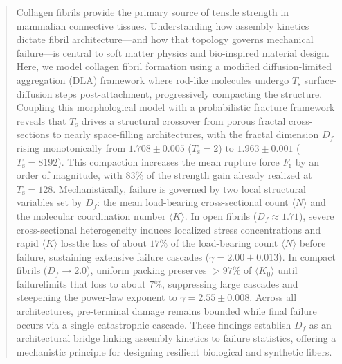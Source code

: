 \documentclass[aps,physrev,preprint,groupedaddress,linenumbers]{revtex4-2}
\newcommand{\added}[1]{{\color{red}#1}}
\newcommand{\deleted}[1]{{\color{red}\sout{#1}}}
\begin{document}
\begin{abstract}
Collagen fibrils provide the primary source of tensile strength in mammalian connective tissues. Understanding how assembly kinetics dictate fibril architecture—and how that topology governs mechanical failure—is central to soft matter physics and bio-inspired material design. Here, we model collagen fibril formation using a modified diffusion-limited aggregation (DLA) framework where rod-like molecules undergo $T_{\mathrm{s}}$ surface-diffusion steps post-attachment, progressively compacting the structure. Coupling this morphological model with a probabilistic fracture framework reveals that $T_{\mathrm{s}}$ drives a structural crossover from porous fractal cross-sections to nearly space-filling architectures, with the fractal dimension $D_f$ rising monotonically from $1.708 \pm 0.005$ ($T_{\mathrm{s}} = 2$) to $1.963 \pm 0.001$ ($T_{\mathrm{s}} = 8192$). This compaction increases the mean rupture force $F_{\mathrm{r}}$ by an order of magnitude, with $83\%$ of the strength gain already realized at $T_{\mathrm{s}} = 128$. Mechanistically, failure is governed by two local structural variables set by $D_f$: the mean load-bearing cross-sectional count $\langle N \rangle$ and the molecular coordination number $\langle K \rangle$. In open fibrils ($D_f \approx 1.71$), severe cross-sectional heterogeneity induces localized stress concentrations and \deleted{rapid $\langle K \rangle$ loss}\added{the loss of about $17\%$ of the load-bearing count $\langle N \rangle$ before failure}, sustaining extensive failure cascades ($\gamma = 2.00 \pm 0.013$). In compact fibrils ($D_f \to 2.0$), uniform packing \deleted{preserves $>97\%$ of $\langle K_0 \rangle$ until failure}\added{limits that loss to about $7\%$}, suppressing large cascades and steepening the power-law exponent to $\gamma = 2.55 \pm 0.008$. Across all architectures, pre-terminal damage remains bounded while final failure occurs via a single catastrophic cascade. These findings establish $D_f$ as an architectural bridge linking assembly kinetics to failure statistics, offering a mechanistic principle for designing resilient biological and synthetic fibers.\end{abstract}


\maketitle
\end{document}
